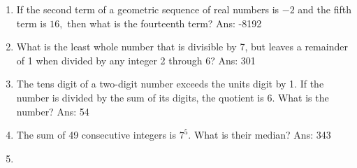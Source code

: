 \documentclass{article}
\begin{document}
\begin{enumerate}
    \item If the second term of a geometric sequence of real numbers is $-2$ and the fifth term is $16,$ then what is the fourteenth term? Ans: -8192
    \item What is the least whole number that is divisible by 7, but leaves a remainder of 1 when divided by any integer 2 through 6? Ans: 301
    \item The tens digit of a two-digit number exceeds the units digit by 1. If the number is divided by the sum of its digits, the quotient is 6. What is the number? Ans: 54
    \item The sum of 49 consecutive integers is $7^5$. What is their median?
    Ans: 343
    \item 
\end{enumerate}
\end{document}

